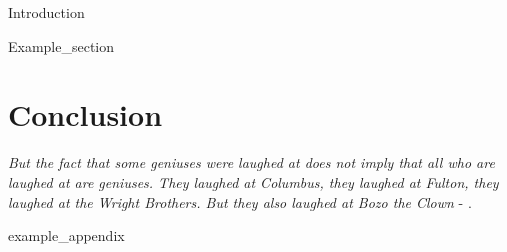 \documentclass{article}
\begin{document}




\mainmatter

{Introduction}

{Example_section}

\section{Conclusion}
\textit{But the fact that some geniuses were laughed at does not imply that all who are laughed at are geniuses. They laughed at Columbus, they laughed at Fulton, they laughed at the Wright Brothers. But they also laughed at Bozo the Clown} -  \textcite{sagan_1993}.

\newpage
\printbibliography[heading = bibintoc, title = Bibliography]    %

\addappendix
{example_appendix}

\end{document}
